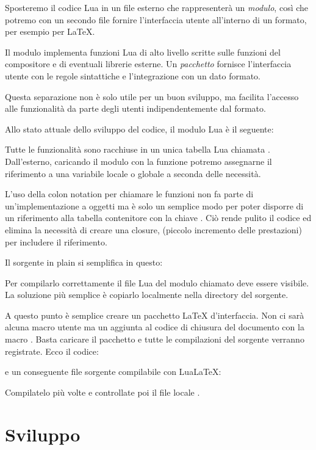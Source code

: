 Sposteremo il codice Lua in un file esterno che rappresenterà un \emph{modulo},
così che potremo con un secondo file fornire l'interfaccia utente all'interno
di un formato, per esempio per \LaTeX.

Il modulo implementa funzioni Lua di alto livello scritte sulle funzioni del
compositore e di eventuali librerie esterne. Un \emph{pacchetto} fornisce
l'interfaccia utente con le regole sintattiche e l'integrazione con un dato
formato.

Questa separazione non è solo utile per un buon sviluppo, ma facilita l'accesso
alle funzionalità da parte degli utenti indipendentemente dal formato.

Allo stato attuale dello sviluppo del codice, il modulo Lua è il seguente:

Tutte le funzionalità sono racchiuse in un unica tabella Lua chiamata
. Dall'esterno, caricando il modulo con la funzione 
potremo assegnarne il riferimento a una variabile locale o globale a seconda
delle necessità.

L'uso della colon notation per chiamare le funzioni non fa parte di
un'implementazione a oggetti ma è solo un semplice modo per poter disporre di un
riferimento alla tabella contenitore con la chiave . Ciò rende pulito
il codice ed elimina la necessità di creare una closure, (piccolo incremento
delle prestazioni) per includere il riferimento.

Il sorgente in plain \LuaTeX{} si semplifica in questo:

Per compilarlo correttamente il file Lua del modulo chiamato
 deve essere visibile. La soluzione più semplice è
copiarlo localmente nella directory del sorgente.

A questo punto è semplice creare un pacchetto \LaTeX{} d'interfaccia. Non ci
sarà alcuna macro utente ma un aggiunta al codice di chiusura del documento
con la macro . Basta caricare il pacchetto e tutte le
compilazioni del sorgente verranno registrate. Ecco il codice:

e un conseguente file sorgente compilabile con Lua\LaTeX{}:

Compilatelo più volte e controllate poi il file locale .


\section{Sviluppo}

